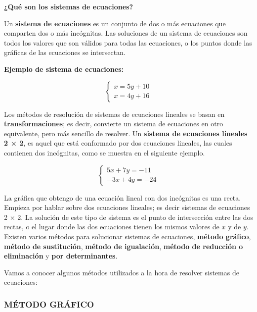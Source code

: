 \documentclass[12pt,a4paper]{article}
\begin{document}
\begin{tcolorbox}[colback=fondorosa,colframe=rojoclaro,title=MINI EXPLICACIÓN SISTEMAS DE ECUACIONES,breakable]

\textbf{¿Qué son los sistemas de ecuaciones?}

Un \textbf{sistema de ecuaciones} es un conjunto de dos o más ecuaciones que comparten dos o más incógnitas. Las soluciones de un sistema de ecuaciones son todos los valores que son válidos para todas las ecuaciones, o los puntos donde las gráficas de las ecuaciones se intersectan.

\textbf{Ejemplo de sistema de ecuaciones:}

\[ \begin{cases}
x = 5y + 10 \\
x = 4y + 16
\end{cases} \]

Los métodos de resolución de sistemas de ecuaciones lineales se basan en \textbf{transformaciones}; es decir, convierte un sistema de ecuaciones en otro equivalente, pero más sencillo de resolver. Un \textbf{sistema de ecuaciones lineales 2 × 2}, es aquel que está conformado por dos ecuaciones lineales, las cuales contienen dos incógnitas, como se muestra en el siguiente ejemplo.

\[ \begin{cases}
5x + 7y = -11 \\
-3x + 4y = -24
\end{cases} \]

La gráfica que obtengo de una ecuación lineal con dos incógnitas es una recta. Empieza por hablar sobre dos ecuaciones lineales; es decir sistemas de ecuaciones 2 × 2. La solución de este tipo de sistema es el punto de intersección entre las dos rectas, o el lugar donde las dos ecuaciones tienen los mismos valores de $x$ y de $y$. Existen varios métodos para solucionar sistemas de ecuaciones, \textbf{método gráfico}, \textbf{método de sustitución}, \textbf{método de igualación}, \textbf{método de reducción o eliminación} y \textbf{por determinantes}.

\end{tcolorbox}

Vamos a conocer algunos métodos utilizados a la hora de resolver sistemas de ecuaciones:

\subsubsection*{MÉTODO GRÁFICO}
\end{document}
